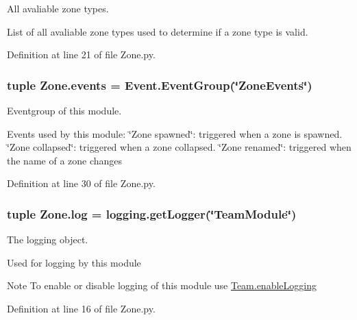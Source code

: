 All avaliable zone types. 

List of all avaliable zone types used to determine if a zone type is valid. 

Definition at line 21 of file Zone.py.

\hypertarget{namespace_zone_a2cf3edd088ca6482872ba018b81ef52a}{
\subsubsection[{events}]{\setlength{\rightskip}{0pt plus 5cm}tuple {\bf Zone.events} = {\bf Event.EventGroup}(\char`\"{}ZoneEvents\char`\"{})}}
\label{namespace_zone_a2cf3edd088ca6482872ba018b81ef52a}


Eventgroup of this module. 

Events used by this module: \char`\"{}Zone spawned\char`\"{}: triggered when a zone is spawned. \char`\"{}Zone collapsed\char`\"{}: triggered when a zone collapsed. \char`\"{}Zone renamed\char`\"{}: triggered when the name of a zone changes 

Definition at line 30 of file Zone.py.

\hypertarget{namespace_zone_aad90704d2c88929bd92b7acf2b9a09d6}{
\subsubsection[{log}]{\setlength{\rightskip}{0pt plus 5cm}tuple {\bf Zone.log} = logging.getLogger(\char`\"{}TeamModule\char`\"{})}}
\label{namespace_zone_aad90704d2c88929bd92b7acf2b9a09d6}


The logging object. 

Used for logging by this module \begin{DoxyNote}{Note}
To enable or disable logging of this module use \hyperlink{namespace_team_a391de1d02502546ec5d88de1632b3bc2}{Team.enableLogging} 
\end{DoxyNote}


Definition at line 16 of file Zone.py.

